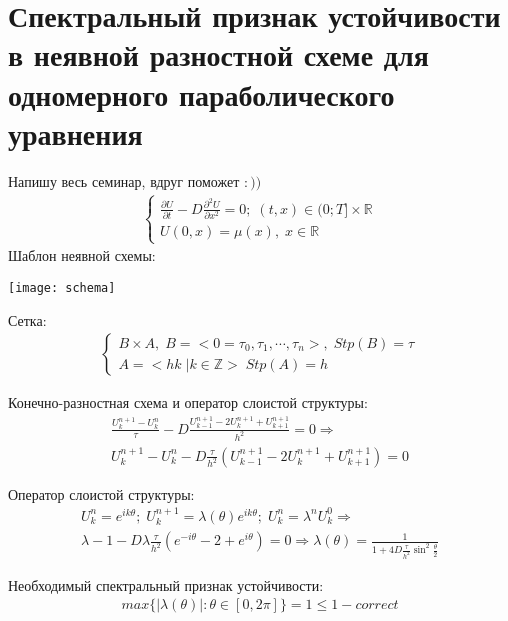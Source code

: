 \documentclass[__main__.tex]{subfiles}
\begin{document}
\section{Спектральный признак устойчивости в неявной разностной схеме для одномерного параболического уравнения}

Напишу весь семинар, вдруг поможет $:))$
\begin{gather*}
	\begin{cases}
	\frac{\partial U}{\partial t}-D\frac{\partial^2U}{\partial x^2}=0;\; (t,x)\in (0;T]\times\mathbb{R}\\
	U(0,x)=\mu(x),\; x\in\mathbb{R}
	\end{cases}
\end{gather*}
Шаблон неявной схемы:
\begin{figure*}[h]
\centering
\texttt{[image: schema]}
\end{figure*}

Сетка:
\begin{gather*}
	\begin{cases}
	B\times A,\; B=<0=\tau_0,\tau_1,\cdots,\tau_n>,\; Stp(B)=\tau\\
	A=<hk\;|k\in\mathbb{Z}> \; Stp(A)=h
	\end{cases}
\end{gather*}

Конечно-разностная схема и оператор слоистой структуры:
\begin{gather*}
	\frac{U_k^{n+1}-U_k^n}{\tau}-D\frac{U_{k-1}^{n+1}-2U_{k}^{n+1}+U_{k+1}^{n+1}}{h^2}=0\Rightarrow\\
	U_k^{n+1}-U_k^{n}-D\frac{\tau}{h^2}\left(U_{k-1}^{n+1}-2U_{k}^{n+1}+U_{k+1}^{n+1}\right)=0
\end{gather*}

Оператор слоистой структуры:
\begin{gather*}
U_k^n=e^{ik\theta};\;U_k^{n+1}=\lambda(\theta)e^{ik\theta};\;U_k^n=\lambda^nU_k^0\Rightarrow\\
\lambda-1-D\lambda\frac{\tau}{h^2}(e^{-i\theta}-2+e^{i\theta})=0\Rightarrow
\lambda(\theta)=\frac{1}{1+4D\frac{\tau}{h^2}\sin^2\frac{\theta}{2}}
\end{gather*}

Необходимый спектральный признак устойчивости:
\begin{gather*}
	max\{|\lambda(\theta)|:\theta\in\left[0,2\pi\right]\}=1 \le 1-correct
\end{gather*}
\end{document}
